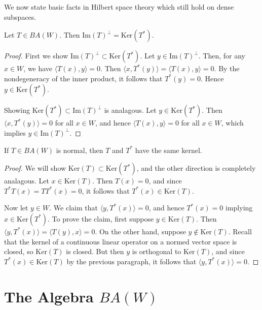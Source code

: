 \documentclass[12pt]{article}
\begin{document}
We now state basic facts in Hilbert space theory which still hold on dense subspaces.

\begin{proposition}
\label{prop_im_perp_ker_ast}
	Let $T\in BA(W)$. Then $\text{Im}(T)^\perp = \text{Ker}(T^\ast)$.	
\end{proposition}
\begin{proof}
	First we show $\text{Im}(T)^\perp \subset \text{Ker}(T^\ast)$. Let $y\in\text{Im}(T)^\perp$. Then, for any $x\in W$, we have $\langle T(x), y \rangle = 0$. Then $\langle x, T^\ast (y)\rangle = \langle T(x), y \rangle = 0$. By the nondegeneracy of the inner product, it follows that $T^\ast(y)=0$. Hence $y\in\text{Ker}(T^\ast)$.

	Showing $\text{Ker}(T^\ast)\subset\text{Im}(T)^\perp$ is analagous. Let $y\in\text{Ker}(T^\ast)$. Then $\langle x, T^\ast(y) \rangle = 0$ for all $x\in W$, and hence $\langle T(x), y \rangle = 0$ for all $x\in W$, which implies $y\in\text{Im}(T)^\perp$.
\end{proof}

\begin{proposition}
\label{prop_normal_same_kernel}
	If $T\in BA(W)$ is normal, then $T$ and $T^\ast$ have the same kernel.
\end{proposition}
\begin{proof}
	We will show $\text{Ker}(T)\subset\text{Ker}(T^\ast)$, and the other direction is completely analagous. Let $x\in\text{Ker}(T)$. Then $T(x) = 0$, and since $T^\ast T(x)= TT^\ast(x)=0$, it follows that $T^\ast(x)\in\text{Ker}(T)$.

	Now let $y\in W$. We claim that $\langle y, T^\ast(x) \rangle=0$, and hence $T^\ast(x)=0$ implying $x\in \text{Ker}(T^\ast)$. To prove the claim, first suppose $y\in\text{Ker}(T)$. Then $\langle y, T^\ast(x) \rangle = \langle T(y), x \rangle = 0$. On the other hand, suppose $y\not\in\text{Ker}(T)$. Recall that the kernel of a continuous linear operator on a normed vector space is closed, so $\text{Ker}(T)$ is closed. But then $y$ is orthogonal to $\text{Ker}(T)$, and since $T^\ast(x)\in\text{Ker}(T)$ by the previous paragraph, it follows that $\langle y, T^\ast(x) \rangle = 0$. 
\end{proof}


\section{The Algebra $BA(W)$} %
\end{document}
